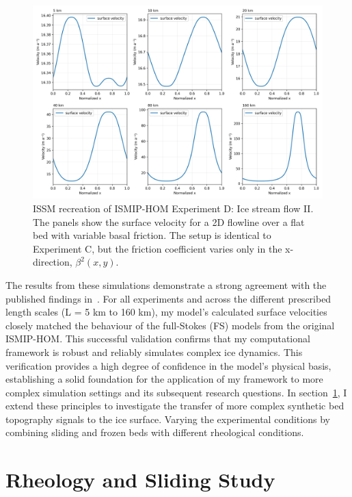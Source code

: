 \begin{figure}[H]
    \includegraphics[scale=0.45]{ExpD_velocity_panels.png}
    \caption{ ISSM recreation of ISMIP-HOM Experiment D: Ice stream flow II. The panels show the surface velocity for a 2D flowline over a flat bed with variable basal friction. The setup is identical to Experiment C, but the friction coefficient varies only in the x-direction, $\beta^{2}(x,y)$.}
    \label{fig:4.4}
\end{figure}

The results from these simulations demonstrate a strong agreement with the published findings in~\cite{Pattyn_2008}. For all experiments and across the different prescribed length scales (L = 5 km to 160 km), my model's calculated surface velocities closely matched the behaviour of the full-Stokes (FS) models from the original ISMIP-HOM. This successful validation confirms that my computational framework is robust and reliably simulates complex ice dynamics. This verification provides a high degree of confidence in the model's physical basis, establishing a solid foundation for the application of my framework to more complex simulation settings and its subsequent research questions. In section~\ref{study1}, I extend these principles to investigate the transfer of more complex synthetic bed topography signals to the ice surface. Varying the experimental conditions by combining sliding and frozen beds with different rheological conditions. 

\section{Rheology and Sliding Study}\label{study1}

